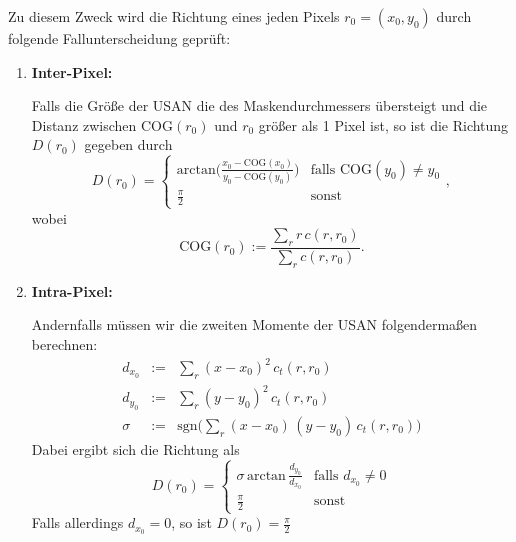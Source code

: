\documentclass[a4paper, 11pt]{report}
\theoremstyle{definition}
\begin{document}
		Zu diesem Zweck wird die Richtung eines jeden Pixels $r_0 = (x_0, y_0)$ durch folgende Fallunterscheidung geprüft:
		\begin{enumerate}
			\item \textbf{Inter-Pixel:}

			\noindent Falls die Größe der USAN die des Maskendurchmessers übersteigt und die Distanz zwischen $\text{COG}(r_0)$ und $r_0$ größer als 1 Pixel ist, so ist die Richtung $D(r_0)$ gegeben durch
			$$ D(r_0) = \begin{cases}
				\text{arctan}\bigg(
					\frac{x_0 - \text{COG}(x_0)}
					{y_0 - \text{COG}(y_0)}
				\bigg) & \text{falls } \text{COG}(y_0) \neq y_0 \\
				
				\frac{\pi}{2} & \text{sonst}

			\end{cases}, $$
			wobei
			$$ \text{COG}(r_0) := \frac	{\sum_r r\,c(r,r_0)}	{\sum_r c(r,r_0)}. $$
			\item \textbf{Intra-Pixel:}
			
			\noindent Andernfalls müssen wir die zweiten Momente der USAN folgendermaßen berechnen:
			\begin{eqnarray*}
				d_{x_0} &:=& \sum_r (x-x_0)^2 \, c_t(r,r_0) \\
				d_{y_0} &:=& \sum_r (y-y_0)^2 \, c_t(r,r_0) \\
				\sigma 	&:=& \text{sgn}\bigg(\sum_r (x-x_0) \, (y-y_0) \, c_t(r,r_0)\bigg)
			\end{eqnarray*}
			Dabei ergibt sich die Richtung als
			$$ D(r_0) = \begin{cases}
					\sigma \, \text{arctan} \, \frac{d_{y_0}}{d_{x_0}} 	&	\text{falls } d_{x_0} \neq 0 \\ 
					\frac{\pi}{2}										&	\text{sonst}
				\end{cases}$$
			Falls allerdings $d_{x_0} = 0$, so ist $D(r_0) = \frac{\pi}{2}$
		\end{enumerate}
\end{document}
